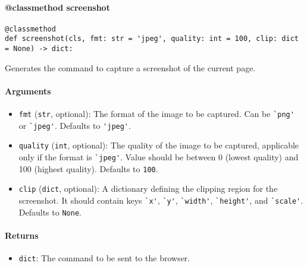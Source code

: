 \documentclass{article}
\begin{document}
\paragraph{@classmethod screenshot}

\begin{lstlisting}[style=pythonstyle]
@classmethod
def screenshot(cls, fmt: str = 'jpeg', quality: int = 100, clip: dict = None) -> dict:
\end{lstlisting}

\noindent Generates the command to capture a screenshot of the current page.

\paragraph{Arguments}

\begin{itemize}
    \item \lstinline[style=pythonstyle]|fmt| (\lstinline[style=pythonstyle]|str|, optional): The format of the image to be captured. Can be \lstinline[style=pythonstyle]|`png'| or \lstinline[style=pythonstyle]|`jpeg'|. Defaults to \lstinline[style=pythonstyle]|'jpeg'|.
    \item \lstinline[style=pythonstyle]|quality| (\lstinline[style=pythonstyle]|int|, optional): The quality of the image to be captured, applicable only if the format is \lstinline[style=pythonstyle]|`jpeg'|. Value should be between 0 (lowest quality) and 100 (highest quality). Defaults to \lstinline[style=pythonstyle]|100|.
    \item \lstinline[style=pythonstyle]|clip| (\lstinline[style=pythonstyle]|dict|, optional): A dictionary defining the clipping region for the screenshot. It should contain keys \lstinline[style=pythonstyle]|`x'|, \lstinline[style=pythonstyle]|`y'|, \lstinline[style=pythonstyle]|`width'|, \lstinline[style=pythonstyle]|`height'|, and \lstinline[style=pythonstyle]|`scale'|. Defaults to \lstinline[style=pythonstyle]|None|.
\end{itemize}

\paragraph{Returns}

\begin{itemize}
    \item \lstinline[style=pythonstyle]|dict|: The command to be sent to the browser.
\end{itemize}
\end{document}

